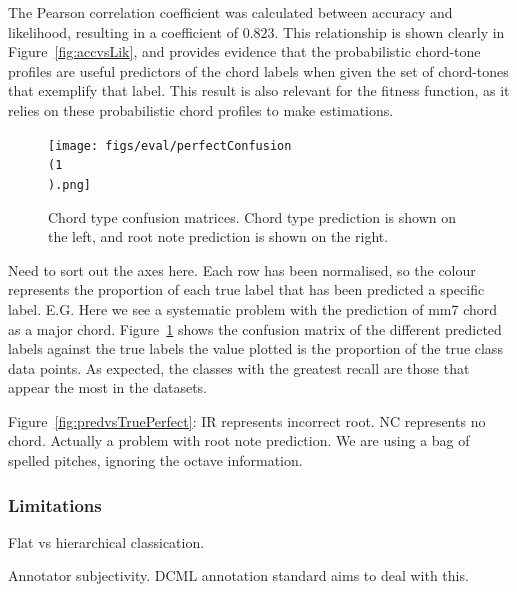 \documentclass[12pt,a4paper,twoside,openany]{report} \usepackage[pdfborder={0 0 0}]{hyperref}    %
\theoremstyle{definition} \newtheorem{definition}{Definition}[section]
\begin{document}
  The Pearson correlation coefficient was calculated between accuracy and likelihood, resulting in a coefficient 
  of $0.823$. This relationship is shown clearly in Figure~\ref{fig:accvsLik}, and provides evidence that the
  probabilistic chord-tone profiles are useful predictors of the chord labels when given the set of chord-tones that
  exemplify that label. This result is also relevant for the fitness function, as it relies on these probabilistic
  chord profiles to make estimations.

  \begin{figure}[ht]
    \begin{center}
      \texttt{[image: figs/eval/perfectConfusion\\(1\\).png]}
    \end{center}
    \caption{Chord type confusion matrices. Chord type prediction is shown on the left, and root note prediction is shown on the right.}
    \label{fig:perfectConfusion}
  \end{figure}

  Need to sort out the axes here. Each row has been normalised, so the colour represents the proportion of each true
  label that has been predicted a specific label. E.G. Here we see a systematic problem with the prediction of mm7 chord
  as a major chord. 
  Figure~\ref{fig:perfectConfusion} shows the confusion matrix of the different predicted labels against the true
  labels the value plotted is the proportion of the true class data points.
  As expected, the classes with the greatest recall are those that appear the most in the datasets. 


  Figure~\ref{fig:predvsTruePerfect}: IR represents incorrect root. NC represents no chord. Actually a problem with root
  note prediction. We are using a bag of spelled pitches, ignoring the octave information.

  \subsubsection{Limitations}

  Flat vs hierarchical classication. 

  Annotator subjectivity. DCML annotation standard aims to deal with this.\cite{humphreyFourTimelyInsights2015}
    

\end{document}

